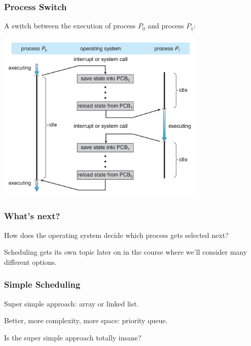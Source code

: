 \begin{frame}
	\frametitle{Process Switch}

	A switch between the execution of process $P_{0}$ and process $P_{1}$:

	\begin{center}
		\includegraphics[width=0.75\textwidth]{images/process-switch.png}
	\end{center}

\end{frame}


\begin{frame}
\frametitle{What's next?}

How does the operating system decide which process gets selected next?

Scheduling gets its own topic later on in the course where we'll consider many different options.

\end{frame}



\begin{frame}
\frametitle{Simple Scheduling}

Super simple approach: array or linked list.

Better, more complexity, more space: priority queue.

Is the super simple approach totally insane?

\end{frame}



